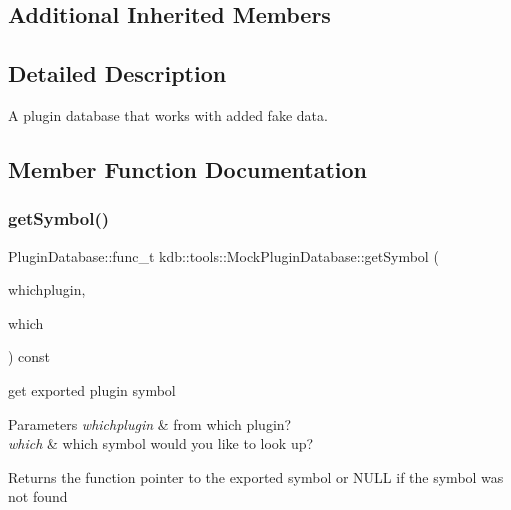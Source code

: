 \subsection*{Additional Inherited Members}


\subsection{Detailed Description}
A plugin database that works with added fake data. 

\subsection{Member Function Documentation}
\mbox{\label{classkdb_1_1tools_1_1MockPluginDatabase_a5a701fd310be0e9f7d14a865c0226517}} 
\subsubsection{\texorpdfstring{get\+Symbol()}{getSymbol()}}
{\footnotesize\ttfamily Plugin\+Database\+::func\+\_\+t kdb\+::tools\+::\+Mock\+Plugin\+Database\+::get\+Symbol (\begin{DoxyParamCaption}\item[{\hyperlink{classkdb_1_1tools_1_1PluginSpec}{Plugin\+Spec} const \&}]{whichplugin,  }\item[{std\+::string const \&}]{which }\end{DoxyParamCaption}) const\hspace{0.3cm}{\ttfamily [virtual]}}



get exported plugin symbol 


\begin{DoxyParams}{Parameters}
{\em whichplugin} & from which plugin? \\
\hline
{\em which} & which symbol would you like to look up?\\
\hline
\end{DoxyParams}
\begin{DoxyReturn}{Returns}
the function pointer to the exported symbol or N\+U\+LL if the symbol was not found 
\end{DoxyReturn}


